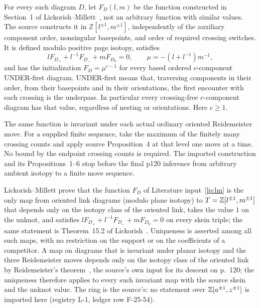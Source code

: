 \begin{literature}\label{lp:lm}\label{src:lm}
For every such diagram $D$, let $F_D(l,m)$ be the function constructed in
Section~1 of Lickorish--Millett~\cite{LickorishMillett}, not an arbitrary function with similar
values. The source constructs it in
$\mathbb Z[l^{\pm1},m^{\pm1}]$, independently of the auxiliary component
order, nonsingular basepoints, and order of required crossing switches.
It is defined modulo positive page isotopy, satisfies
\begin{equation}\label{lp:source-skein}
 l F_{D_+}+l^{-1} F_{D_-}+m F_{D_0}=0,
 \qquad \mu=-(l+l^{-1})m^{-1},
\end{equation}
and has the initialization $F_D=\mu^{c-1}$ for every based ordered
$c$-component UNDER-first diagram. UNDER-first means that, traversing
components in their order, from their basepoints and in their orientations,
the first encounter with each crossing is the underpass. In particular
every crossing-free $c$-component diagram has that value, regardless of
nesting or orientations. Here $c\geq1$.

The same function is invariant under each actual ordinary oriented
Reidemeister move. For a supplied finite sequence, take the maximum of the
finitely many crossing counts and apply source Proposition~4 at that level
one move at a time. No bound by the endpoint crossing counts is required.
The imported construction and its Propositions~1--6 stop before the final
p120 inference from arbitrary ambient isotopy to a finite move sequence.
\end{literature}

\begin{literature}\label{lp:lm-uniqueness}
Lickorish--Millett prove \cite[Theorem, pp.~112--113, with the uniqueness
argument on p.~120]{LickorishMillett} that the function $F_D$ of Literature
input~\ref{lp:lm} is the only map from oriented link diagrams (modulo plane
isotopy) to $T=\mathbb Z[l^{\pm1},m^{\pm1}]$ that depends only on the isotopy class
of the oriented link, takes the value $1$ on the unknot, and satisfies
$lF_{D_+}+l^{-1}F_{D_-}+mF_{D_0}=0$ on every skein triple; the same statement
is Theorem~15.2 of Lickorish~\cite{LickorishGTM}. Uniqueness is asserted
among all such maps, with no restriction on the support or on the
coefficients of a competitor. A map on diagrams that is invariant under
planar isotopy and the three Reidemeister moves depends only on the isotopy
class of the oriented link by Reidemeister's theorem~\cite{Reidemeister}, the
source's own input for its descent on p.~120; the uniqueness therefore
applies to every such invariant map with the source skein and the unknot
value. The ring is the source's: no statement over $\mathbb Z[a^{\pm1},z^{\pm1}]$
is imported here (registry L-1, ledger row F-25-54).
\end{literature}

